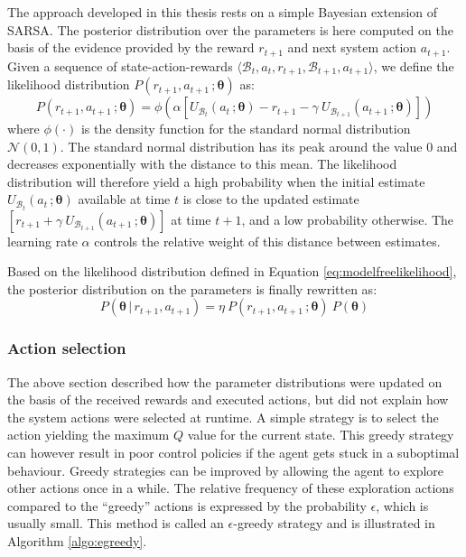 
The approach developed in this thesis rests on a simple Bayesian extension of SARSA.  The posterior distribution over the parameters is here computed on the basis of the evidence provided by the reward $r_{t+1}$ and next system action $a_{t+1}$.  Given a sequence of state-action-rewards $\langle \mathcal{B}_t, a_t, r_{t+1}, \mathcal{B}_{t+1}, a_{t+1} \rangle$, we define the likelihood distribution $P(r_{t+1}, a_{t+1} \,; \boldsymbol\theta)$ as:
\begin{equation}
P(r_{t+1}, a_{t+1} \,; \boldsymbol\theta) = \phi \left(\alpha \left[ U_{\mathcal{B}_t}\left(a_t \,; \boldsymbol\theta\right) - r_{t+1} - \gamma \ U_{\mathcal{B}_{t+1}} \left(a_{t+1} \,; \boldsymbol\theta\right) \right] \right) \label{eq:modelfreelikelihood}
\end{equation}
where $\phi(\cdot)$ is the density function for the standard normal distribution $\mathcal{N}(0, 1)$. The standard normal distribution has its peak around the value 0 and decreases exponentially with the distance to this mean. The likelihood distribution will therefore yield a high probability when the initial estimate 
$U_{\mathcal{B}_t}(a_t \,; \boldsymbol\theta)$ available at time $t$ is close to the updated estimate $\left[r_{t+1} + \gamma \ U_{\mathcal{B}_{t+1}} (a_{t+1} \,; \boldsymbol\theta) \right]$ at time $t+1$, and a low probability otherwise. The learning rate $\alpha$ controls the relative weight of this distance between estimates. 

Based on the likelihood distribution defined in Equation \eqref{eq:modelfreelikelihood}, the posterior distribution on the parameters is finally rewritten as: 
\begin{equation}
P(\boldsymbol\theta \, | \, r_{t+1}, a_{t+1}) = \eta \ P(r_{t+1}, a_{t+1} \,; \boldsymbol\theta)  \ P(\boldsymbol\theta)  \label{eq:posteriormodelfree}
\end{equation}


\subsubsection*{Action selection}

The above section described how the parameter distributions were updated on the basis of the received rewards and executed actions, but did not explain how the system actions were selected at runtime.  A simple strategy is to select the action yielding the maximum $Q$ value for the current state.  This greedy strategy can however result in poor control policies if the agent gets stuck in a suboptimal behaviour.  Greedy strategies can be improved by allowing the agent to explore other actions once in a while. The relative frequency of these exploration actions compared to the  ``greedy'' actions is expressed by the probability $\epsilon$, which is usually small. This method is called an $\epsilon$-greedy strategy and is illustrated in Algorithm \ref{algo:egreedy}.

